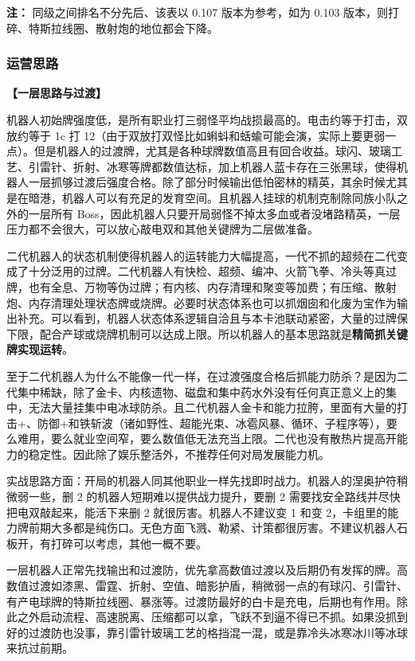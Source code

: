 ﻿\documentclass[12pt, a4paper]{article}
\begin{document}
\textbf{注：} 同级之间排名不分先后、该表以 0.107 版本为参考，如为 0.103 版本，则打碎、特斯拉线圈、散射炮的地位都会下降。

\subsubsection{运营思路}

\textbf{【一层思路与过渡】}

机器人初始牌强度低，是所有职业打三弱怪平均战损最高的。电击约等于打击，双放约等于 1c 打 12（由于双放打双怪比如蝌蚪和蛞蝓可能会演，实际上要更弱一点）。但是机器人的过渡牌，尤其是各种球牌数值高且有回合收益。球闪、玻璃工艺、引雷针、折射、冰寒等牌都数值达标，加上机器人蓝卡存在三张黑球，使得机器人一层抓够过渡后强度合格。除了部分时候输出低怕密林的精英，其余时候尤其是在暗港，机器人可以有充足的发育空间。且机器人挂球的机制克制除同族小队之外的一层所有 Boss，因此机器人只要开局弱怪不掉太多血或者没堵路精英，一层压力都不会很大，可以放心敲电双和其他关键牌为二层做准备。

二代机器人的状态机制使得机器人的运转能力大幅提高，一代不抓的超频在二代变成了十分泛用的过牌。二代机器人有快检、超频、编冲、火箭飞拳、冷头等真过牌，也有全息、万物等伪过牌；有内核、内存清理和聚变等加费；有压缩、散射炮、内存清理处理状态牌或烧牌。必要时状态体系也可以抓烟囱和化废为宝作为输出补充。可以看到，机器人状态体系逻辑自洽且与本卡池联动紧密，大量的过牌保下限，配合产球或烧牌机制可以达成上限。所以机器人的基本思路就是\textbf{精简抓关键牌实现运转}。

至于二代机器人为什么不能像一代一样，在过渡强度合格后抓能力防杀？是因为二代集中稀缺，除了金卡、内核遗物、磁盘和集中药水外没有任何真正意义上的集中，无法大量挂集中电冰球防杀。且二代机器人金卡和能力拉胯，里面有大量的打击+、防御+和铁斩波（诸如野性、超能光束、冰雹风暴、循环、子程序等），要么难用，要么就业空间窄，要么数值低无法充当上限。二代也没有散热片提高开能力的稳定性。因此除了娱乐整活外，不推荐任何对局发展能力机。

实战思路方面：开局的机器人同其他职业一样先找即时战力。机器人的涅奥护符稍微弱一些，删 2 的机器人短期难以提供战力提升，要删 2 需要找安全路线并尽快把电双敲起来，能活下来删 2 就很厉害。机器人不建议变 1 和变 2，卡组里的能力牌前期大多都是纯伤口。无色方面飞溅、勒紧、计策都很厉害。不建议机器人石板开，有打碎可以考虑，其他一概不要。

一层机器人正常先找输出和过渡防，优先拿高数值过渡以及后期仍有发挥的牌。高数值过渡如漆黑、雷霆、折射、空值、暗影护盾，稍微弱一点的有球闪、引雷针、有产电球牌的特斯拉线圈、暴涨等。过渡防最好的白卡是充电，后期也有作用。除此之外启动流程、高速脱离、压缩都可以拿，飞跃不到逼不得已不抓。如果没抓到好的过渡防也没事，靠引雷针玻璃工艺的格挡混一混，或是靠冷头冰寒冰川等冰球来抗过前期。
\end{document}
